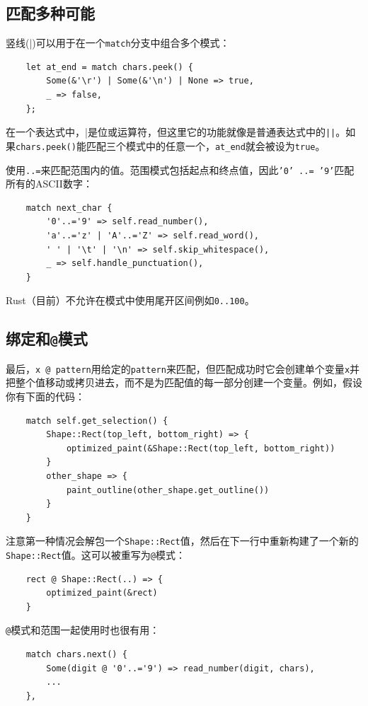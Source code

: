 \subsection{匹配多种可能}
竖线(|)可以用于在一个\texttt{match}分支中组合多个模式：
\begin{verbatim}
    let at_end = match chars.peek() {
        Some(&'\r') | Some(&'\n') | None => true,
        _ => false,
    };
\end{verbatim}

在一个表达式中，|是位或运算符，但这里它的功能就像是普通表达式中的\texttt{||}。如果\texttt{chars.peek()}能匹配三个模式中的任意一个，\texttt{at\_end}就会被设为\texttt{true}。

使用\texttt{..=}来匹配范围内的值。范围模式包括起点和终点值，因此\texttt{'0' ..= '9'}匹配所有的ASCII数字：
\begin{verbatim}
    match next_char {
        '0'..='9' => self.read_number(),
        'a'..='z' | 'A'..='Z' => self.read_word(),
        ' ' | '\t' | '\n' => self.skip_whitespace(),
        _ => self.handle_punctuation(),
    }
\end{verbatim}

Rust（目前）不允许在模式中使用尾开区间例如\texttt{0..100}。

\subsection{绑定和\texttt{@}模式}
最后，\texttt{x @ pattern}用给定的\texttt{pattern}来匹配，但匹配成功时它会创建单个变量\texttt{x}并把整个值移动或拷贝进去，而不是为匹配值的每一部分创建一个变量。例如，假设你有下面的代码：
\begin{verbatim}
    match self.get_selection() {
        Shape::Rect(top_left, bottom_right) => {
            optimized_paint(&Shape::Rect(top_left, bottom_right))
        }
        other_shape => {
            paint_outline(other_shape.get_outline())
        }
    }    
\end{verbatim}
注意第一种情况会解包一个\texttt{Shape::Rect}值，然后在下一行中重新构建了一个新的\texttt{Shape::Rect}值。这可以被重写为\texttt{@}模式：
\begin{verbatim}
    rect @ Shape::Rect(..) => {
        optimized_paint(&rect)
    }
\end{verbatim}

\texttt{@}模式和范围一起使用时也很有用：
\begin{verbatim}
    match chars.next() {
        Some(digit @ '0'..='9') => read_number(digit, chars),
        ...
    },
\end{verbatim}

